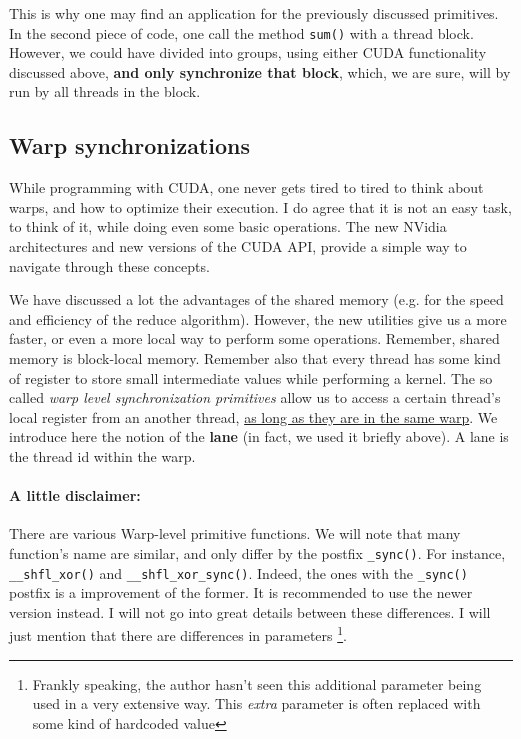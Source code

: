 \documentclass[12pt]{article}
\begin{document}
This is why one may find an application for the previously discussed primitives. 
In the second piece of code, one call the method \verb|sum()| with a thread block. However, 
we could have divided into groups, using either CUDA functionality discussed above, 
\textbf{and only synchronize that block}, which, we are sure, will by run by all threads in 
the block. 

\subsection*{Warp synchronizations}
While programming with CUDA, one never gets tired to tired to think about warps, and 
how to optimize their execution. I do agree that it is not an easy task, to think of it, 
while doing even some basic operations. The new NVidia architectures and new versions of the
CUDA API, provide a simple way to navigate through these concepts.

We have discussed a lot the advantages of the shared memory (e.g. for the speed and efficiency
of the reduce algorithm). However, the new utilities give us a more faster, or even a more
local way to perform some operations. Remember, shared memory is block-local memory. 
Remember also that every thread has some kind of register to store small intermediate 
values while performing a kernel. The so called \textit{warp level synchronization primitives}
allow us to access a certain thread's local register from an another thread, 
\underline{as long as they are in the same warp}. We introduce here the notion of the 
\textbf{lane} (in fact, we used it briefly above). A lane is the thread id within the warp.


\paragraph{A little disclaimer: }There are various Warp-level primitive functions. We will note that many function's
name are similar, and only differ by the postfix \verb|_sync()|. For instance, 
\verb|__shfl_xor()| and \verb|__shfl_xor_sync()|. Indeed, the ones with the \verb|_sync()|
postfix is a improvement of the former. It is recommended to use the newer version instead.
I will not go into great details between these differences. 
I will just mention that there are differences in parameters
\footnote{Frankly speaking, the author hasn't seen this additional parameter 
being used in a very extensive way. This \textit{extra} parameter is often replaced with 
some kind of hardcoded value}.
\end{document}

